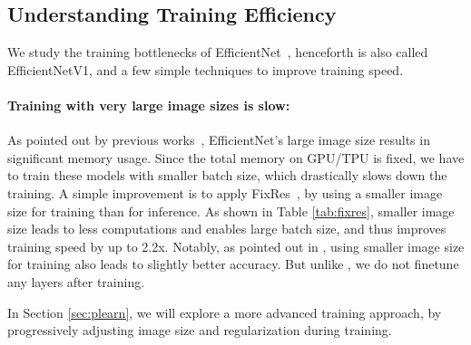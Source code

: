 \documentclass{article}
\begin{document}
\subsection{Understanding Training Efficiency}

We study the training bottlenecks of EfficientNet~\cite{efficientnet19}, henceforth is also called EfficientNetV1, and a few simple techniques to improve training speed.

\paragraph{Training with very large image sizes is slow:}
As pointed out by previous works~\cite{regnet20}, EfficientNet's large image size results in significant memory usage. Since the total memory on GPU/TPU is fixed, we have to train these models with smaller batch size, which drastically slows down the training. A simple improvement is to apply FixRes~\cite{fixres20}, by using a smaller image size for training than for inference. As shown in Table \ref{tab:fixres}, smaller image size leads to less computations and enables large batch size,  and thus improves training speed by up to 2.2x. Notably, as pointed out in \cite{fixefficientnet20,nfnet21}, using smaller image size for training also leads to slightly better accuracy. But unlike \cite{fixres20}, we do not finetune any layers after training.

\begin{table}[h]
    \vskip -0.1in
    \centering
    \caption{EfficientNet-B6 accuracy and training throughput for different batch sizes and image size.}
    \vskip -0.1in
\label{tab:fixres}
\end{table} 
In Section \ref{sec:plearn}, we will explore a more advanced training approach, by progressively adjusting image size and regularization during training. 
\end{document}

